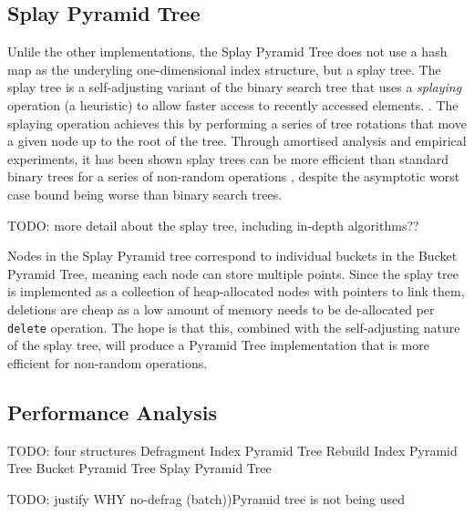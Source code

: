 \subsection{Splay Pyramid Tree}

Unlile the other implementations, the Splay Pyramid Tree does not use a hash map as the underyling one-dimensional index structure, but a splay tree. The splay tree is a self-adjusting variant of the binary search tree that uses a \textit{splaying} operation (a heuristic) to allow faster access to recently accessed elements. \cite{splay-tree}. The splaying operation achieves this by performing a series of tree rotations that move a given node up to the root of the tree. Through amortised analysis and empirical experiments, it has been shown splay trees can be more efficient than standard binary trees for a series of non-random operations \cite{splay-tree, TODO}, despite the asymptotic worst case bound being worse than binary search trees.

TODO: more detail about the splay tree, including in-depth algorithms??

Nodes in the Splay Pyramid tree correspond to individual buckets in the Bucket Pyramid Tree, meaning each node can store multiple points. Since the splay tree is implemented as a collection of heap-allocated nodes with pointers to link them, deletions are cheap as a low amount of memory needs to be de-allocated per \texttt{delete} operation. The hope is that this, combined with the self-adjusting nature of the splay tree, will produce a Pyramid Tree implementation that is more efficient for non-random operations.

\subsection{Performance Analysis}

TODO: four structures
	Defragment Index Pyramid Tree
	Rebuild Index Pyramid Tree
	Bucket Pyramid Tree
	Splay Pyramid Tree

TODO: justify WHY no-defrag (batch))Pyramid tree is not being used


